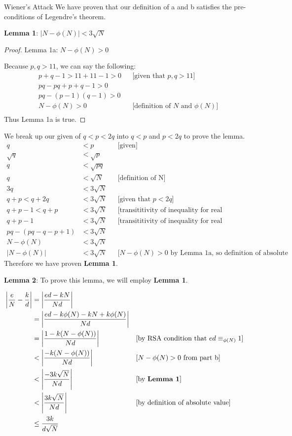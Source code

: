 \documentclass[11pt, nopagenumbers]{adamblan-hw}
\newcommand{\abs}[1]{\left| #1 \right|}
\begin{document}
\begin{question}{\color{red} Wiener's Attack}
We have proven that our definition of a and b satisfies the pre-conditions of Legendre's theorem.

\begin{part} \textbf{Lemma 1}: $\abs{N - \phi(N)} < 3\sqrt{N}$

\begin{proof}
Lemma 1a: $N - \phi(N) > 0$

Because $p, q > 11$, we can say the following:
\begin{align*}
p + q - 1 > 11 + 11 - 1 > 0 && \text{[given that $p, q > 11$]} \\
pq - pq + p + q- 1 > 0 \\
pq - (p - 1)(q - 1) > 0 \\
N - \phi(N) > 0 && \text{[definition of $N$ and $\phi(N)$]}\\
\end{align*}
Thus Lemma 1a is true.
\end{proof}
We break up our given of $q < p < 2q$ into $q < p$ and $p < 2q$ to prove the lemma.
\begin{align*}
q &< p && \text{[given]}\\
\sqrt{q} &< \sqrt{p} \\
q &< \sqrt{pq} \\
q &< \sqrt{N} && \text{[definition of N]} \\
3q &< 3\sqrt{N} \\
q + p < q + 2q &< 3\sqrt{N} && \text{[given that $p < 2q$]}\\
q + p - 1< q + p &< 3\sqrt{N} && \text{[transititivity of inequality for real numbers]} \\
q + p - 1 &< 3\sqrt{N} && \text{[transititivity of inequality for real numbers]} \\
pq - (pq - q - p + 1) &< 3\sqrt{N} \\
N - \phi(N) &< 3\sqrt{N} \\
\abs{N - \phi(N)} &< 3\sqrt{N} && \text{[$N - \phi(N) > 0$ by Lemma 1a, so definition of absolute value applies]}
\end{align*}
Therefore we have proven \textbf{Lemma 1}.
\end{part}
\pagebreak
\begin{part} \textbf{Lemma 2}:
To prove this lemma, we will employ \textbf{Lemma 1}.

\begin{align*} 
\abs{\frac{e}{N} - \frac{k}{d}} &= \abs{\frac{ed - kN}{Nd}} \\
&= \abs{\frac{ed - k\phi(N) - kN + k\phi(N)}{Nd}} \\
&= \abs{\frac{1 - k(N - \phi(N))}{Nd}} && \text{[by RSA condition that $ed \equiv_{\phi(N)} 1$]} \\
&< \abs{\frac{-k(N - \phi(N))}{Nd}} && \text{[$N - \phi(N) > 0$ from part b]} \\
&< \abs{\frac{-3k\sqrt{N}}{Nd}} && \text{[by \textbf{Lemma 1}]} \\
&< \abs{\frac{3k\sqrt{N}}{Nd}} && \text{[by definition of absolute value]} \\
&\leq \frac{3k}{d\sqrt{N}} \\
\end{align*}


\end{part}
\end{question}
\end{document}
